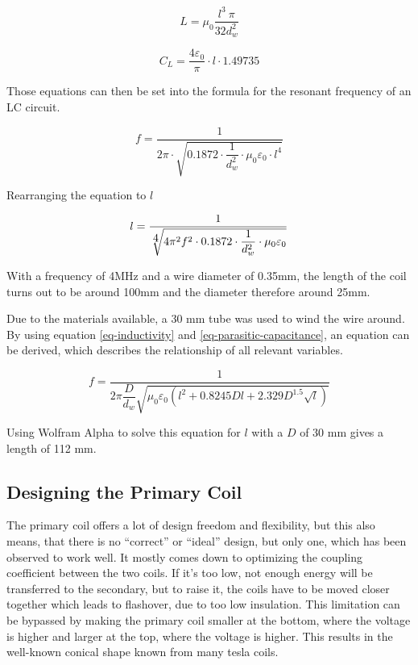 \begin{equation}
    L = \mu_0 \frac{l^3\ \pi}{32 d_w^2}
\end{equation}

\begin{equation}
    C_L = \frac{4\varepsilon_0}{\pi} \cdot l \cdot 1.49735
\end{equation}

Those equations can then be set into the formula for the resonant frequency of an LC circuit.

\begin{equation}
    f = \frac{1}{2\pi \cdot \sqrt{0.1872 \cdot \dfrac{1}{d_w^2} \cdot \mu_0 \varepsilon_0 \cdot l^4}}
\end{equation}

Rearranging the equation to \(l\)

\begin{equation}
    l = \frac{1}{\sqrt[\scalebox{1}{4}]{4\pi^2 f^2 \cdot0.1872 \cdot \dfrac{1}{d_w^2} \cdot \mu_0 \varepsilon_0}}
\end{equation}

With a frequency of 4MHz and a wire diameter of 0.35mm, the length of the coil turns out to be around 100mm and the diameter therefore around 25mm.

Due to the materials available, a 30 mm tube was used to wind the wire around. By using equation \ref{eq-inductivity} and \ref{eq-parasitic-capacitance}, an equation can be derived, which describes the relationship of all relevant variables.

\begin{equation}
    f = \frac{1}{2\pi \dfrac{D}{d_w} \sqrt{\mu_0 \varepsilon_0 \left( l^2 + 0.8245 D l + 2.329 D^{1.5} \sqrt{l} \right)}}
\end{equation}

Using Wolfram Alpha to solve this equation for \(l\) with a \(D\) of 30 mm gives a length of 112 mm.

\subsection{Designing the Primary Coil}
\label{sec:designing-the-primary}

The primary coil offers a lot of design freedom and flexibility, but this also means, that there is no \enquote{correct} or \enquote{ideal} design, but only one, which has been observed to work well. It mostly comes down to optimizing the coupling coefficient between the two coils. If it's too low, not enough energy will be transferred to the secondary, but to raise it, the coils have to be moved closer together which leads to flashover, due to too low insulation. %
This limitation can be bypassed by making the primary coil smaller at the bottom, where the voltage is higher and larger at the top, where the voltage is higher. This results in the well-known conical shape known from many tesla coils.

